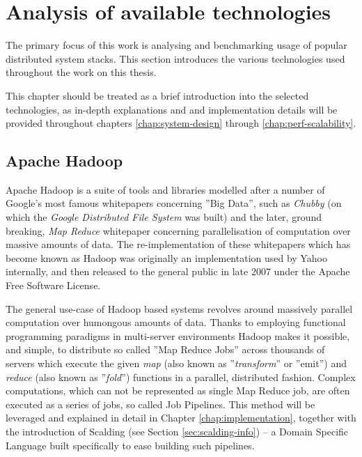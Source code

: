 \chapter{Analysis of available technologies}
\label{cha:existing-and-selected-tech}

The primary focus of this work is analysing and benchmarking usage of popular distributed system stacks. 
This section introduces the various technologies used throughout the work on this thesis.

This chapter should be treated as a brief introduction into the selected technologies, as in-depth explanations and and implementation details will be provided throughout chapters \ref{chap:system-design} through \ref{chap:perf-scalability}.

\section{Apache Hadoop}
\label{sec:hadoop}

Apache Hadoop is a suite of tools and libraries modelled after a number of Google's most famous whitepapers concerning ''Big Data'', such as \textit{Chubby} \cite{chubby} (on which the \textit{Google Distributed File System} \cite{gfs} was built) and the later, ground breaking, \textit{Map Reduce} \cite{map-reduce} whitepaper concerning parallelisation of computation over massive amounts of data.
The re-implementation of these whitepapers which has become known as Hadoop was originally an implementation used by Yahoo \cite{yahoo-hadoop} internally, and then released to the general public in late 2007 under the Apache Free Software License.

The general use-case of Hadoop based systems revolves around massively parallel computation over humongous amounts of data. Thanks to employing functional programming paradigms in multi-server environments Hadoop makes it possible, and simple, to distribute so called ''Map Reduce Jobs'' across thousands of servers which execute the given \textit{map} (also known as ''\textit{transform}'' or ''emit'') and \textit{reduce} (also known as ''\textit{fold}'') functions in a parallel, distributed fashion. Complex computations, which can not be represented as single Map Reduce job, are often executed as a series of jobs, so called Job Pipelines. This method will be leveraged and explained in detail in Chapter \ref{chap:implementation}, together with the introduction of Scalding (see Section \ref{sec:scalding-info}) -- a Domain Specific Language built specifically to ease building such pipelines.

